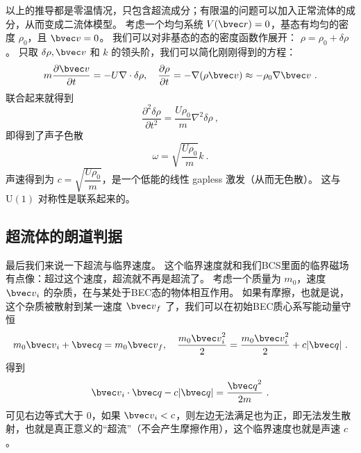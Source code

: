 以上的推导都是零温情况，只包含超流成分；有限温的问题可以加入正常流体的成分，从而变成二流体模型。 考虑一个均匀系统 $V(\bvec r) = 0$，基态有均匀的密度 $\rho_0$，且 ${\bvec v} = 0$。 我们可以对非基态的态的密度函数作展开： $\rho = \rho_0+\delta\rho$。 只取 $\delta\rho,{\bvec v}$ 和 $k$ 的领头阶，我们可以简化刚刚得到的方程：
\begin{equation}
m\frac{\partial\bvec v}{\partial t} = -U\nabla\cdot\delta\rho,\quad \frac{\partial\rho}{\partial t} = -\nabla(\rho{\bvec v}) \approx-\rho_0\nabla\bvec v~.
\end{equation}
联合起来就得到
\begin{equation}
\frac{\partial^2\delta\rho}{\partial t^2} = \frac{U\rho_0}{m}\nabla^2\delta\rho~,
\end{equation}
即得到了声子色散
\begin{equation}
\omega = \sqrt{\frac{U\rho_0}{m}}k~.
\end{equation}
声速得到为 $c=\sqrt{\dfrac{U\rho_0}{m}}$，是一个低能的线性 gapless 激发（从而无色散）。 这与 $\text{U}(1)$ 对称性是联系起来的。
\subsection{超流体的朗道判据}
最后我们来说一下超流与临界速度。 这个临界速度就和我们BCS里面的临界磁场有点像：超过这个速度，超流就不再是超流了。
考虑一个质量为 $m_0$，速度 ${\bvec v}_i$ 的杂质，在与某处于BEC态的物体相互作用。 如果有摩擦，也就是说，这个杂质被散射到某一速度 ${\bvec v}_f$ 了，我们可以在初始BEC质心系写能动量守恒
\begin{equation}
m_0{\bvec v}_i + {\bvec q} = m_0{\bvec v}_f,\quad \frac{m_0{\bvec v}_i^2}{2} = \frac{m_0{\bvec v}_i^2}{2} + c|{\bvec q}|~.
\end{equation}
得到
\begin{equation}
{\bvec v}_i\cdot{\bvec q}-c|{\bvec q}| = \frac{{\bvec q}^2}{2m}~.
\end{equation}
可见右边等式大于 $0$，如果 ${\bvec v}_i<c$，则左边无法满足也为正，即无法发生散射，也就是真正意义的“超流”（不会产生摩擦作用），这个临界速度也就是声速 $c$。

